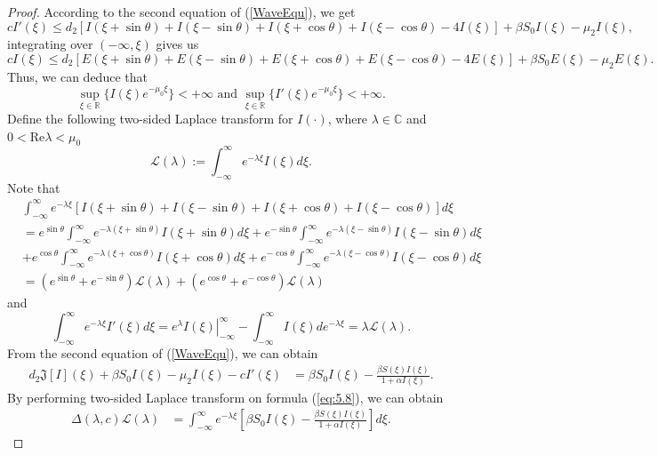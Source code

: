 \documentclass[final,3p,times]{elsarticle}
\numberwithin{equation}{section}
\begin{document}
\begin{proof}
According to  the second equation of (\ref{WaveEqu}), we get
\[
cI'(\xi)\leq d_2[I(\xi + \sin\theta)+I(\xi - \sin\theta)+I(\xi + \cos\theta)+I(\xi - \cos\theta)-4I(\xi)]+\beta S_0I(\xi)-\mu_2I(\xi),
\]
integrating over \((-\infty, \xi)\) gives us
\[
cI(\xi)\leq d_2[E(\xi + \sin\theta)+E(\xi - \sin\theta)+E(\xi + \cos\theta)+E(\xi - \cos\theta)-4E(\xi)]+\beta S_0E(\xi)-\mu_2E(\xi).
\]
Thus, we can deduce that
\[
\sup_{\xi\in\mathbb{R}}\{I(\xi)e^{-\mu_0\xi}\}<+\infty \text{ and } \sup_{\xi\in\mathbb{R}}\{I'(\xi)e^{-\mu_0\xi}\}<+\infty.
\]
Define the following two-sided Laplace transform for \(I(\cdot)\), where \(\lambda\in\mathbb{C}\) and \(0 < \text{Re}\lambda < \mu_0\)
\[
\mathcal{L}(\lambda):=\int_{-\infty}^{\infty}e^{-\lambda\xi}I(\xi)d\xi.
\]
Note that
\begin{align*}
&\int_{-\infty}^{\infty}e^{-\lambda\xi}[I(\xi + \sin\theta)+I(\xi - \sin\theta)+I(\xi + \cos\theta)+I(\xi - \cos\theta)]d\xi\\
&=e^{\sin\theta}\int_{-\infty}^{\infty}e^{-\lambda(\xi + \sin\theta)}I(\xi + \sin\theta)d\xi
+e^{-\sin\theta}\int_{-\infty}^{\infty}e^{-\lambda(\xi - \sin\theta)}I(\xi - \sin\theta)d\xi\\
&+e^{\cos\theta}\int_{-\infty}^{\infty}e^{-\lambda(\xi + \cos\theta)}I(\xi + \cos\theta)d\xi
+e^{-\cos\theta}\int_{-\infty}^{\infty}e^{-\lambda(\xi - \cos\theta)}I(\xi - \cos\theta)d\xi\\
&=(e^{\sin\theta}+e^{-\sin\theta})\mathcal{L}(\lambda)+(e^{\cos\theta}+e^{-\cos\theta})\mathcal{L}(\lambda)
\end{align*}
and
\[
\int_{-\infty}^{\infty}e^{-\lambda\xi}I'(\xi)d\xi=\left.e^{\lambda}I(\xi)\right|_{-\infty}^{\infty}-\int_{-\infty}^{\infty}I(\xi)de^{-\lambda\xi}=\lambda\mathcal{L}(\lambda).
\]
From the second equation of (\ref{WaveEqu}), we can obtain
\begin{align}
d_2\mathfrak{J}[I](\xi)+\beta S_0I(\xi)-\mu_2I(\xi)-cI'(\xi)&=\beta S_0I(\xi)-\frac{\beta S(\xi)I(\xi)}{1 + \alpha I(\xi)}.
\label{eq:5.8}
\end{align}
By performing two-sided Laplace transform on formula (\ref{eq:5.8}), we can obtain
\begin{align}\label{eq:5.9}
\Delta(\lambda, c)\mathcal{L}(\lambda)&=\int_{-\infty}^{\infty}e^{-\lambda\xi}[\beta S_0I(\xi)-\frac{\beta S(\xi)I(\xi)}{1 + \alpha I(\xi)}]d\xi.

\end{align}
\end{proof}
\end{document}
